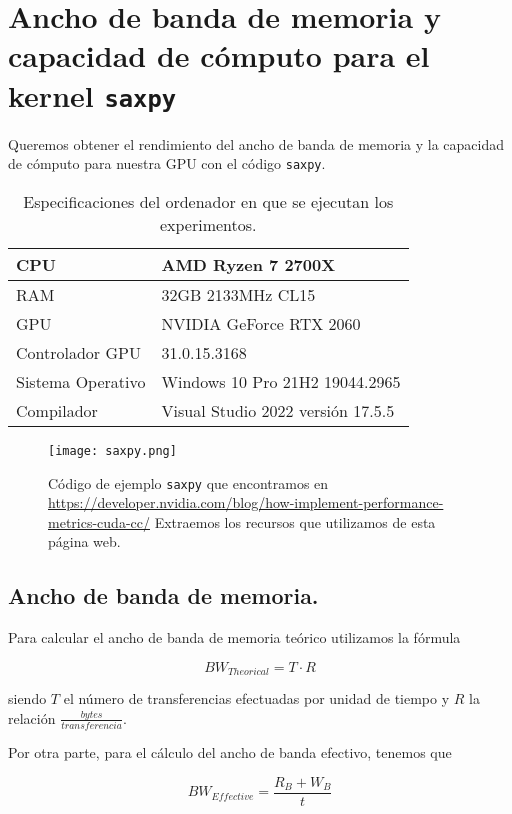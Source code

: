 \section{Ancho de banda de memoria y capacidad de cómputo para el kernel \texttt{saxpy}}

Queremos obtener el rendimiento del ancho de banda de memoria y la capacidad de cómputo para nuestra
GPU con el código \texttt{saxpy}.

\begin{table}[H]
	\centering
	\begin{tabular}{|l|l|}
	\hline
	CPU               & AMD Ryzen 7 2700X                 \\ \hline
	RAM               & 32GB 2133MHz CL15				  \\ \hline
	GPU               & NVIDIA GeForce RTX 2060           \\ \hline
	Controlador GPU   & 31.0.15.3168                      \\ \hline
	Sistema Operativo & Windows 10 Pro 21H2 19044.2965    \\ \hline
	Compilador        & Visual Studio 2022 versión 17.5.5 \\ \hline
	\end{tabular}
	\caption{Especificaciones del ordenador en que se ejecutan los experimentos.}
\end{table}

\begin{figure}[H]
    \centering
    \texttt{[image: saxpy.png]}
    \caption{Código de ejemplo \texttt{saxpy} que encontramos en \url{https://developer.nvidia.com/blog/how-implement-performance-metrics-cuda-cc/}
	Extraemos los recursos que utilizamos de esta página web.}
\end{figure}

\subsection{Ancho de banda de memoria.}

Para calcular el ancho de banda de memoria teórico utilizamos la fórmula

$$ BW_{Theorical} = T \cdot R $$

siendo $T$ el número de transferencias efectuadas por unidad de tiempo y $R$ la relación $\frac{bytes}{transferencia}$.

Por otra parte, para el cálculo del ancho de banda efectivo, tenemos que

$$ BW_{Effective} = \frac{R_{B} + W_{B}}{t} $$

